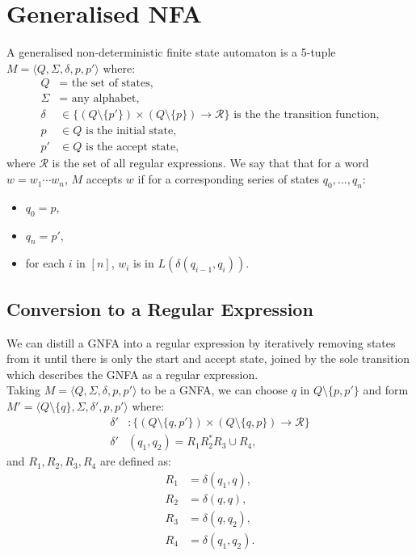 \section{Generalised NFA}

A generalised non-deterministic finite state automaton is a 5-tuple
$M = \langle Q, \Sigma, \delta, p, p' \rangle$ where:
\begin{align*}
    Q      &= \text{ the set of states,} \\
    \Sigma &= \text{ any alphabet,} \\ 
    \delta &\in \big\{ 
        (Q \setminus \{p'\})
        \times 
        (Q \setminus \{p\})
        \to \mathcal{R} 
        \big\} \text{ is the the transition function,} \\
    p      &\in Q \text{ is the initial state,} \\
    p'     &\in Q \text{ is the accept state,}
\end{align*} where $\mathcal{R}$ is the set of all regular
expressions. We say that that for a word $w = w_1 \cdots w_n$,
$M$ accepts $w$ if for a corresponding series of states
$q_0, \ldots, q_n$: \begin{itemize}
    \item $q_0 = p$,
    \item $q_n = p'$,
    \item for each $i$ in $[n]$, $w_i$ is in 
        $L(\delta(q_{i - 1}, q_i))$.
\end{itemize}

\subsection{Conversion to a Regular Expression}

We can distill a GNFA into a regular expression by iteratively
removing states from it until there is only the start and accept
state, joined by the sole transition which describes the GNFA
as a regular expression.
\\[\baselineskip]
Taking $M = \langle Q, \Sigma, \delta, p, p' \rangle$ to be a
GNFA, we can choose $q$ in $Q \setminus \{p, p'\}$ and form
$M' = \langle Q \setminus \{q\}, \Sigma, \delta', p, p' \rangle$
where: \begin{align*}
    \delta'& : \big\{ 
        (Q \setminus \{q, p'\})
        \times 
        (Q \setminus \{q, p\})
        \to \mathcal{R} 
    \big\} \\
    \delta'&(q_1, q_2) = R_1R_2^*R_3 \cup R_4,
\end{align*} and $R_1, R_2, R_3, R_4$ are defined as: \begin{align*}
    R_1 &= \delta(q_1, q), \\
    R_2 &= \delta(q, q), \\
    R_3 &= \delta(q, q_2), \\
    R_4 &= \delta(q_1, q_2).
\end{align*}